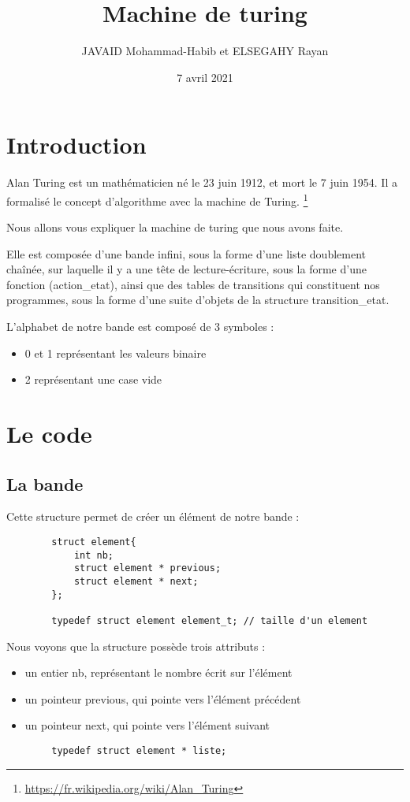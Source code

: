 \documentclass[a4paper,10pt, parskip=true]{scrartcl}
\title{Machine de turing}
\author{JAVAID Mohammad-Habib et ELSEGAHY Rayan}
\date{7 avril 2021}
\begin{document}
\maketitle



\section{Introduction}
    
    Alan Turing est un mathématicien né le 23 juin 1912, et mort le 7 juin 1954. Il a formalisé le concept d'algorithme avec la machine de Turing. 
    \footnote{\url{https://fr.wikipedia.org/wiki/Alan_Turing}} 
    
    Nous allons vous expliquer la machine de turing que nous avons faite. 
    
    Elle est composée d'une bande infini, sous la forme d'une liste doublement chaînée, sur laquelle il y a une tête de lecture-écriture, sous la forme d'une fonction (action\_etat), ainsi que des tables de transitions qui constituent nos programmes, sous la forme d'une suite d'objets de la structure transition\_etat.
    
    L'alphabet de notre bande est composé de 3 symboles : 
    \begin{itemize}
    \item 0 et 1 représentant les valeurs binaire
    \item 2 représentant une case vide
    \end{itemize}
    
\section{Le code}
    \subsection{La bande}
        Cette structure permet de créer un élément de notre bande :
        \begin{verbatim}
        struct element{ 
        	int nb;
        	struct element * previous;
        	struct element * next;
        };
        
        typedef struct element element_t; // taille d'un element 
        \end{verbatim}
        
        Nous voyons que la structure possède trois attributs : 
        
        \begin{itemize}
        \item un entier nb, représentant le nombre écrit sur l'élément
        \item un pointeur previous, qui pointe vers l'élément précédent
        \item un pointeur next, qui pointe vers l'élément suivant
        \end{itemize}
        \begin{verbatim}
        typedef struct element * liste;
        \end{verbatim}
        
\end{document}
